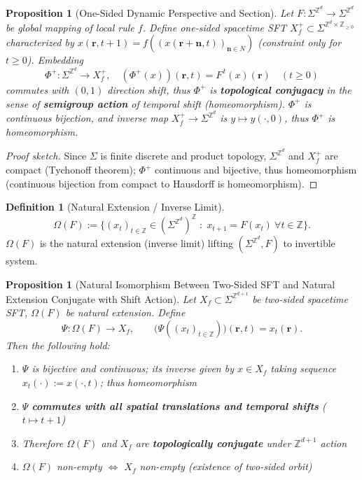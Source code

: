 \documentclass[11pt]{article}
\newtheorem{proposition}[theorem]{Proposition}
\theoremstyle{definition}
\newtheorem{definition}[theorem]{Definition}
\theoremstyle{remark}
\begin{document}
\begin{proposition}[One-Sided Dynamic Perspective and Section]\label{prop:onesided}
Let \( F:\Sigma^{\mathbb Z^d}\to\Sigma^{\mathbb Z^d} \) be global mapping of local rule \( f \). Define one-sided spacetime SFT \( X_f^+\subset\Sigma^{\mathbb Z^d\times\mathbb Z_{\ge0}} \) characterized by \( x(\mathbf r,t+1)=f((x(\mathbf r+\mathbf n,t))_{\mathbf n\in N}) \) (constraint only for \( t\ge 0 \)). Embedding
\[
\Phi^+:\Sigma^{\mathbb Z^d}\to X_f^+,\quad
(\Phi^+(x))(\mathbf r,t)=F^{\,t}(x)(\mathbf r)\quad (t\ge0)
\]
commutes with \( (0,1) \) direction shift, thus \( \Phi^+ \) is \textbf{topological conjugacy} in the sense of \textbf{semigroup action} of temporal shift (homeomorphism). \( \Phi^+ \) is continuous bijection, and inverse map \( X_f^+\to\Sigma^{\mathbb Z^d} \) is \( y\mapsto y(\cdot,0) \), thus \( \Phi^+ \) is homeomorphism.
\end{proposition}

\begin{proof}[Proof sketch]
Since \( \Sigma \) is finite discrete and product topology, \( \Sigma^{\mathbb Z^d} \) and \( X_f^+ \) are compact (Tychonoff theorem); \( \Phi^+ \) continuous and bijective, thus homeomorphism (continuous bijection from compact to Hausdorff is homeomorphism).
\end{proof}

\begin{definition}[Natural Extension / Inverse Limit]\label{def:natural}
\[
\Omega(F)
:=\big\{(x_t)_{t\in\mathbb Z}\in(\Sigma^{\mathbb Z^d})^{\mathbb Z}\;:\;x_{t+1}=F(x_t)\ \forall t\in\mathbb Z\big\}.
\]
\( \Omega(F) \) is the natural extension (inverse limit) lifting \( (\Sigma^{\mathbb Z^d},F) \) to invertible system.
\end{definition}

\begin{proposition}[Natural Isomorphism Between Two-Sided SFT and Natural Extension Conjugate with Shift Action]\label{prop:twosided}
Let \( X_f\subset\Sigma^{\mathbb Z^{d+1}} \) be two-sided spacetime SFT, \( \Omega(F) \) be natural extension. Define
\[
\Psi:\Omega(F)\to X_f,\qquad
\big(\Psi((x_t)_{t\in\mathbb Z})\big)(\mathbf r,t)=x_t(\mathbf r).
\]
Then the following hold:
\begin{enumerate}[label=(\roman*)]
\item \( \Psi \) is bijective and continuous; its inverse given by \( x\in X_f \) taking sequence \( x_t(\cdot):=x(\cdot,t) \); thus homeomorphism
\item \( \Psi \) \textbf{commutes with all spatial translations and temporal shifts} (\( t\mapsto t+1 \))
\item Therefore \( \Omega(F) \) and \( X_f \) are \textbf{topologically conjugate} under \( \mathbb{Z}^{d+1} \) action
\item \( \Omega(F) \) non-empty \( \Longleftrightarrow \) \( X_f \) non-empty (existence of two-sided orbit)
\end{enumerate}
\end{proposition}
\end{document}
